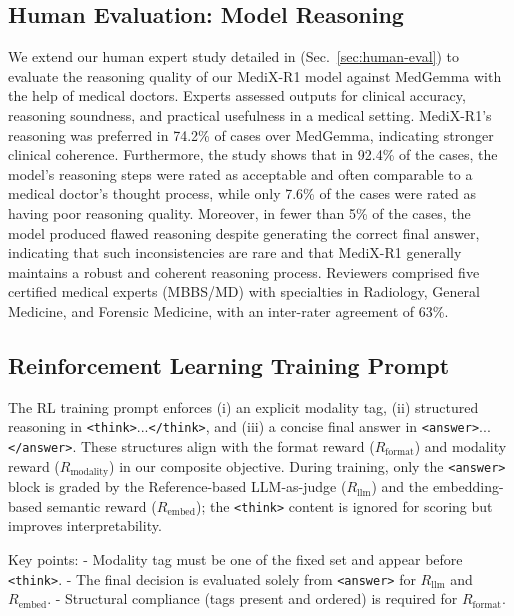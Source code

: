 \documentclass{article}
\theoremstyle{plain}
\theoremstyle{definition}
\theoremstyle{remark}
\begin{document}
\subsection{Human Evaluation: Model Reasoning}
\label{app:human-expert-reasoning}
 We extend our human expert study detailed in (Sec.~\ref{sec:human-eval}) to evaluate the reasoning quality of our MediX-R1 model against MedGemma with the help of medical doctors. Experts assessed outputs for clinical accuracy, reasoning soundness, and practical usefulness in a medical setting. MediX-R1’s reasoning was preferred in 74.2\% of cases over MedGemma, indicating stronger clinical coherence. Furthermore,  the study shows that in 92.4\% of the cases, the model’s reasoning steps were rated as acceptable and often comparable to a medical doctor’s thought process, while only 7.6\% of the cases were rated as having poor reasoning quality. Moreover, in fewer than 5\% of the cases, the model produced flawed reasoning despite generating the correct final answer, indicating that such inconsistencies are rare and that MediX-R1 generally maintains a robust and coherent reasoning process. Reviewers comprised five certified medical experts (MBBS/MD) with specialties in Radiology, General Medicine, and Forensic Medicine, with an inter-rater agreement of 63\%.

\subsection{Reinforcement Learning Training Prompt}
\label{app:rl-prompt}

The RL training prompt enforces (i) an explicit modality tag, (ii) structured reasoning in \texttt{<think>}...\texttt{</think>}, and (iii) a concise final answer in \texttt{<answer>}...\texttt{</answer>}. These structures align with the format reward ($R_{\text{format}}$) and modality reward ($R_{\text{modality}}$) in our composite objective. During training, only the \texttt{<answer>} block is graded by the Reference-based LLM-as-judge ($R_{\text{llm}}$) and the embedding-based semantic reward ($R_{\text{embed}}$); the \texttt{<think>} content is ignored for scoring but improves interpretability.

Key points:
- Modality tag must be one of the fixed set and appear before \texttt{<think>}.
- The final decision is evaluated solely from \texttt{<answer>} for $R_{\text{llm}}$ and $R_{\text{embed}}$.
- Structural compliance (tags present and ordered) is required for $R_{\text{format}}$.
\end{document}
